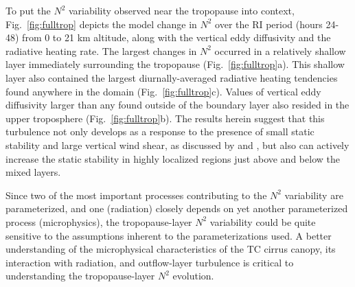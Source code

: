 \documentclass{ametsoc}
\begin{document}
To put the $N^2$ variability observed near the tropopause into context, Fig.~\ref{fig:fulltrop} depicts the model change in $N^2$ over the RI period (hours 24-48) from 0 to 21 km altitude, along with the vertical eddy diffusivity and the radiative heating rate.
The largest changes in $N^2$ occurred in a relatively shallow layer immediately surrounding the tropopause (Fig.~\ref{fig:fulltrop}a).
This shallow layer also contained the largest diurnally-averaged radiative heating tendencies found anywhere in the domain (Fig.~\ref{fig:fulltrop}c).
Values of vertical eddy diffusivity larger than any found outside of the boundary layer also resided in the upper troposphere (Fig.~\ref{fig:fulltrop}b).
The results herein suggest that this turbulence not only develops as a response to the presence of small static stability and large vertical wind shear, as discussed by \cite{Molinarietal} and \cite{DuranMolinari2016}, but also can actively increase the static stability in highly localized regions just above and below the mixed layers.

Since two of the most important processes contributing to the $N^2$ variability are parameterized, and one (radiation) closely depends on yet another parameterized process (microphysics), the tropopause-layer $N^2$ variability could be quite sensitive to the assumptions inherent to the parameterizations used.
A better understanding of the microphysical characteristics of the TC cirrus canopy, its interaction with radiation, and outflow-layer turbulence is critical to understanding the tropopause-layer $N^2$ evolution.


\end{document}
